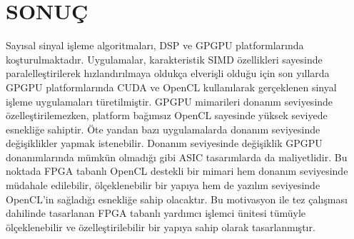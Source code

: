 \chapter{SONUÇ}
Sayısal sinyal işleme algoritmaları, DSP ve GPGPU platformlarında koşturulmaktadır. Uygulamalar, karakteristik SIMD özellikleri sayesinde paralelleştirilerek hızlandırılmaya oldukça elverişli olduğu için son yıllarda GPGPU platformlarında CUDA ve OpenCL kullanılarak gerçeklenen sinyal işleme uygulamaları türetilmiştir. GPGPU mimarileri donanım seviyesinde özelleştirilemezken, platform bağımsız OpenCL sayesinde yüksek seviyede esnekliğe sahiptir. Öte yandan bazı uygulamalarda donanım seviyesinde değişiklikler yapmak istenebilir. Donanım seviyesinde değişiklik GPGPU donanımlarında mümkün olmadığı gibi ASIC tasarımlarda da maliyetlidir. Bu noktada FPGA tabanlı OpenCL destekli bir mimari hem donanım seviyesinde müdahale edilebilir, ölçeklenebilir bir yapıya hem de yazılım seviyesinde OpenCL'in sağladığı esnekliğe sahip olacaktır. Bu motivasyon ile tez çalışması dahilinde tasarlanan FPGA tabanlı yardımcı işlemci ünitesi tümüyle ölçeklenebilir ve özelleştirilebilir bir yapıya sahip olarak tasarlanmıştır.\par
